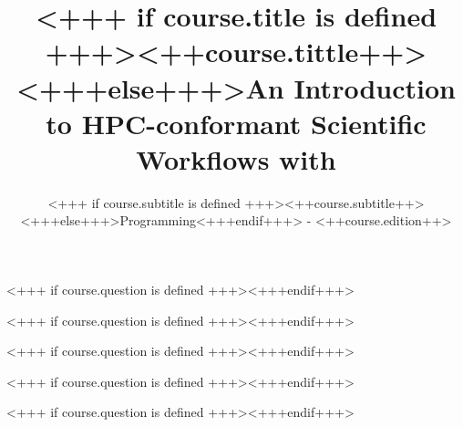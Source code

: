 \documentclass[english,xcolor=pdftex,dvipsnames]{beamer}
\title[<++course.shorttitle++>]{<+++ if course.title is defined +++><++course.tittle++><+++else+++>An Introduction to HPC-conformant Scientific Workflows with \Snakemake<+++endif+++>}
\subtitle{<+++ if course.subtitle is defined +++><++course.subtitle++><+++else+++>Programming<+++endif+++> - <++course.edition++>}
\begin{document}

\begin{frame}[plain] %
  \titlepage
\end{frame}














<+++ if course.question is defined +++><+++endif+++>


<+++ if course.question is defined +++><+++endif+++>
           

<+++ if course.question is defined +++><+++endif+++>
       

<+++ if course.question is defined +++><+++endif+++>
       

<+++ if course.question is defined +++><+++endif+++>
\end{document}
